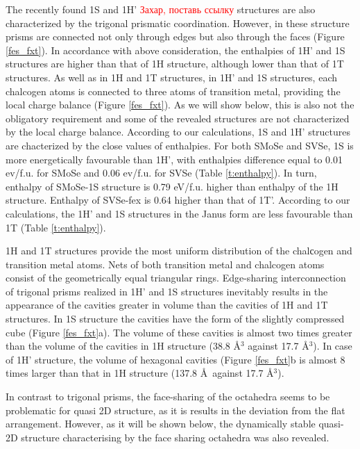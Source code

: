 \documentclass[a4paperm]{article}
\begin{document}
The recently found 1S and 1H' \cite{} \textcolor{red}{Захар, поставь ссылку} structures are also characterized by the trigonal prismatic coordination.
However, in these structure prisms are connected not only through edges but also through the faces (Figure \ref{fes_fxt}).
In accordance with above consideration, the enthalpies of 1H' and 1S structures are higher than that of 1H structure, although lower than that of 1T structures.
As well as in 1H and 1T structures, in 1H' and 1S structures,  each chalcogen atoms is connected to three atoms of transition metal, providing the local charge balance (Figure \ref{fes_fxt}).
As we will show below, this is also not the obligatory requirement and some of the revealed structures are not characterized by the local charge balance.
According to our calculations, 1S and 1H' structures are chacterized by the close values of enthalpies.
For both SMoSe and SVSe, 1S is more energetically favourable than 1H', with enthalpies difference equal to 0.01 ev/f.u. for SMoSe and 0.06 ev/f.u. for SVSe (Table \ref{t:enthalpy}).
In turn, enthalpy of SMoSe-1S structure is 0.79 eV/f.u. higher than enthalpy of the 1H structure.
Enthalpy of SVSe-fex is 0.64 higher than that of 1T'.
According to our calculations, the 1H' and 1S structures in the Janus form are less favourable than 1T (Table \ref{t:enthalpy}).

1H and 1T structures provide the most uniform distribution of the chalсogen and transition metal atoms.
Nets of  both transition metal and chalcogen atoms consist of the geometrically equal triangular rings.
Edge-sharing interconnection of trigonal prisms realized in 1H' and 1S structures inevitably results in the appearance of the cavities greater in volume than the cavities of 1H and 1T structures. 
In 1S structure the cavities have the form of the slightly compressed cube (Figure \ref{fes_fxt}a).
The volume of these cavities is almost two times greater than the volume of the cavities in 1H structure (38.8 \AA$^3$ against 17.7 \AA$^3$).
In case of 1H' structure, the volume of hexagonal cavities (Figure \ref{fes_fxt}b is almost 8 times larger than that in 1H structure (137.8 \AA\ against 17.7 \AA$^3$).

In contrast to trigonal prisms, the face-sharing of the octahedra seems to be problematic for quasi 2D structure, as it is results in the deviation from the flat arrangement.
However, as it will be shown below, the dynamically stable quasi-2D structure characterising by the face sharing octahedra was also revealed.
\end{document}
